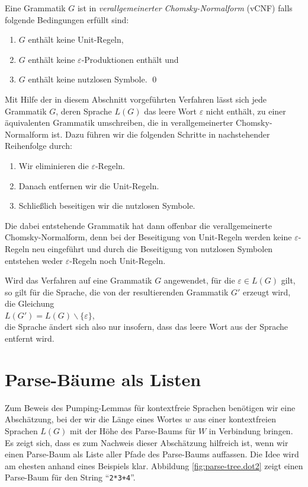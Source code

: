 \begin{Definition}
Eine Grammatik $G$ ist in \emph{verallgemeinerter Chomsky-Normalform} (vCNF) falls folgende
Bedingungen erf\"ullt sind:
\begin{enumerate}
\item $G$ enth\"alt keine Unit-Regeln,
\item $G$ enth\"alt keine $\varepsilon$-Produktionen enth\"alt und
\item $G$ enth\"alt keine nutzlosen Symbole. \qed  
\end{enumerate}
\end{Definition}

\noindent
Mit Hilfe der in diesem Abschnitt vorgef\"uhrten Verfahren l\"asst sich jede Grammatik $G$, deren Sprache
 $L(G)$ das leere Wort $\varepsilon$ nicht enth\"alt,  zu einer \"aquivalenten
Grammatik umschreiben, die in verallgemeinerter Chomsky-Normalform ist.
Dazu f\"uhren wir die folgenden Schritte in nachstehender Reihenfolge durch:
\begin{enumerate}
\item Wir eliminieren die $\varepsilon$-Regeln.
\item Danach entfernen wir die Unit-Regeln.
\item Schlie{\ss}lich beseitigen wir die nutzlosen Symbole.
\end{enumerate}
Die dabei entstehende Grammatik hat dann offenbar die verallgemeinerte Chomsky-Normalform, denn bei der
Beseitigung von Unit-Regeln werden keine $\varepsilon$-Regeln neu eingef\"uhrt und durch die Beseitigung
von nutzlosen Symbolen entstehen weder $\varepsilon$-Regeln noch Unit-Regeln.

Wird das Verfahren auf eine Grammatik $G$ angewendet, f\"ur die $\varepsilon \in L(G)$ gilt,
so gilt f\"ur die Sprache, die von der resultierenden Grammatik $G'$ erzeugt wird, die Gleichung
\\[0.2cm]
\hspace*{1.3cm}
$L(G') = L(G) \backslash \{\varepsilon\}$,
\\[0.2cm]
die Sprache \"andert sich also nur insofern, dass das leere Wort aus der Sprache entfernt wird.

\section{Parse-B\"aume als Listen}
Zum Beweis des Pumping-Lemmas f\"ur kontextfreie Sprachen ben\"otigen wir eine
Absch\"atzung, bei der wir die L\"ange eines Wortes $w$ aus einer kontextfreien Sprachen $L(G)$ 
mit der H\"ohe des Parse-Baums f\"ur $W$ in Verbindung bringen.  Es zeigt sich, dass es zum Nachweis dieser
Absch\"atzung hilfreich ist, wenn wir einen Parse-Baum als Liste aller Pfade des Parse-Baums auffassen.
Die Idee wird am ehesten anhand eines Beispiels klar.  Abbildung \ref{fig:parse-tree.dot2}
zeigt einen Parse-Baum f\"ur den String ``\texttt{2*3+4}''. 


